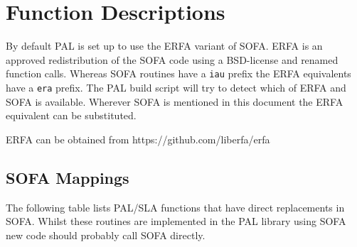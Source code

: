 \documentclass[twoside,11pt]{article}
\newcommand{\htmladdnormallink}[2]{#1}
\renewcommand{\_}{\texttt{\symbol{95}}}
\begin{document}
\clearpage
\appendix
\section{\label{APP:SPEC}Function Descriptions}

By default PAL is set up to use the ERFA variant of SOFA. ERFA is an
approved redistribution of the SOFA code using a BSD-license and
renamed function calls. Whereas SOFA routines have a \texttt{iau} prefix
the ERFA equivalents have a \texttt{era} prefix. The PAL build script
will try to detect which of ERFA and SOFA is available. Wherever SOFA
is mentioned in this document the ERFA equivalent can be substituted.

ERFA can be obtained from \htmladdnormallink{https://github.com/liberfa/erfa}.

\subsection{SOFA Mappings}

The following table lists PAL/SLA functions that have direct
replacements in SOFA. Whilst these routines are implemented in the PAL
library using SOFA new code should probably call SOFA directly.
\end{document}
